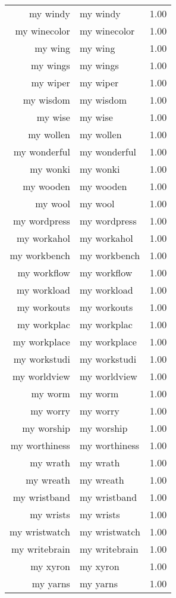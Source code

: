 \begin{table}[ht]
\begin{tabular}{rlr}
  my windy & my windy & 1.00 \\ 
  my winecolor & my winecolor & 1.00 \\ 
  my wing & my wing & 1.00 \\ 
  my wings & my wings & 1.00 \\ 
  my wiper & my wiper & 1.00 \\ 
  my wisdom & my wisdom & 1.00 \\ 
  my wise & my wise & 1.00 \\ 
  my wollen & my wollen & 1.00 \\ 
  my wonderful & my wonderful & 1.00 \\ 
  my wonki & my wonki & 1.00 \\ 
  my wooden & my wooden & 1.00 \\ 
  my wool & my wool & 1.00 \\ 
  my wordpress & my wordpress & 1.00 \\ 
  my workahol & my workahol & 1.00 \\ 
  my workbench & my workbench & 1.00 \\ 
  my workflow & my workflow & 1.00 \\ 
  my workload & my workload & 1.00 \\ 
  my workouts & my workouts & 1.00 \\ 
  my workplac & my workplac & 1.00 \\ 
  my workplace & my workplace & 1.00 \\ 
  my workstudi & my workstudi & 1.00 \\ 
  my worldview & my worldview & 1.00 \\ 
  my worm & my worm & 1.00 \\ 
  my worry & my worry & 1.00 \\ 
  my worship & my worship & 1.00 \\ 
  my worthiness & my worthiness & 1.00 \\ 
  my wrath & my wrath & 1.00 \\ 
  my wreath & my wreath & 1.00 \\ 
  my wristband & my wristband & 1.00 \\ 
  my wrists & my wrists & 1.00 \\ 
  my wristwatch & my wristwatch & 1.00 \\ 
  my writebrain & my writebrain & 1.00 \\ 
  my xyron & my xyron & 1.00 \\ 
  my yarns & my yarns & 1.00 \\ 

\end{tabular}
\end{table}
